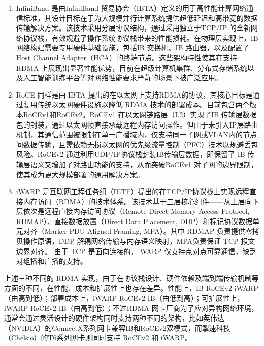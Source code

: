 {\begin{enumerate}[label=\arabic*.]
    \item InfiniBand 是由InfiniBand 贸易协会（IBTA）定义的用于高性能计算网络通信标准，其设计目标在于为大规模并行计算系统提供超低延迟和高带宽的数据传输解决方案。该技术采用分层协议结构，通过采用独立于TCP/IP 的全新网络协议栈，有效规避了操作系统协议栈带来的性能损耗。在物理层实现上，IB 网络构建需要专用硬件基础设施，包括IB 交换机、IB 路由器，以及配置了Host Channel Adapter（HCA）的终端节点。这些架构特性使其在支持 RDMA 上展现出显著性能优势，目前在超级计算机集群、分布式存储系统以及人工智能训练平台等对网络性能要求严苛的场景下被广泛应用。
    \item RoCE 同样是由 IBTA 提出的在以太网上支持RDMA的协议，其核心目标是通过复用传统以太网硬件设施以降低 RDMA 技术的部署成本。目前包含两个版本RoCEv1和RoCEv2。RoCEv1 在以太网链路层（L2）实现了IB 传输层数据包的封装，通过以太网帧直接承载远程内存访问操作。但由于未引入IP层路由机制，其通信范围被限制在单一广播域内，仅支持同一子网或VLAN内的节点间数据传输，且需依赖无损以太网的优先级流量控制（PFC）技术以规避丢包风险。RoCEv2 通过利用UDP/IP协议栈封装IB传输层数据，即保留了 IB 传输层语义又增加了对路由功能的支持，从而突破RoCEv1 对子网的边界限制，使其成为更大规模部署的通用解决方案。
    \item iWARP 是互联网工程任务组（IETF）提出的在TCP/IP协议栈上实现远程直接内存访问（RDMA）的技术体系。该技术基于三层核心组件——从上层向下层依次是远程直接内存访问协议（Remote Direct Memory Access Protocol, RDMAP）、直接数据放置（Direct Data Placement, DDP）和标记协议数据单元对齐（Marker PDU Aligned Framing, MPA）。其中 RDMAP 负责提供零拷贝操作原语，DDP 解耦网络传输与内存语义映射，MPA负责保证 TCP 报文边界对齐。 由于 TCP 是面向连接的，iWARP 仅支持点对点可靠通信，缺乏对组播和广播的支持。
\end{enumerate}

上述三种不同的 RDMA 实现，由于在协议栈设计、硬件依赖及端到端传输机制等方面的不同，在性能、成本和扩展性上也存在差异。性能上，IB \text{>} RoCEv2 \text{>} iWARP（由高到低）；部署成本上，iWARP \text{>} RoCEv2 \text{>} IB（由低到高）；可扩展性上，iWARP \text{>} RoCEv2 \text{>} IB（由高到低）；不过RDMA 网卡厂商为了应对异构网络环境，通常会通过灵活设计的硬件架构同时支持两种不同的架构，比如英伟达（NVIDIA）的ConnectX系列网卡兼容IB和RoCEv2双模式，而掣速科技（Chelsio）的T6系列网卡则同时支持 RoCEv2 和 iWARP。

}
